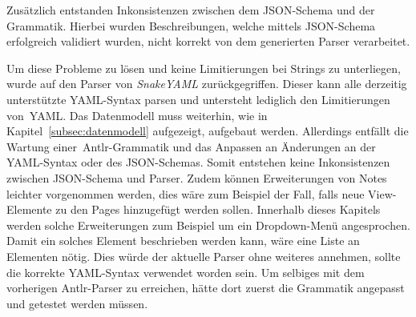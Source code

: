 Zusätzlich entstanden Inkonsistenzen zwischen dem JSON-Schema und der Grammatik.
Hierbei wurden Beschreibungen, welche mittels JSON-Schema erfolgreich validiert wurden, nicht korrekt von dem generierten Parser verarbeitet.

Um diese Probleme zu lösen und keine Limitierungen bei Strings zu unterliegen, wurde auf den Parser von \textit{SnakeYAML} zurückgegriffen.
Dieser kann alle derzeitig unterstützte YAML-Syntax parsen und untersteht lediglich den Limitierungen von~\ac{YAML}.
Das Datenmodell muss weiterhin, wie in Kapitel~\ref{subsec:datenmodell} aufgezeigt, aufgebaut werden.
Allerdings entfällt die Wartung einer~\ac{Antlr}-Grammatik und das Anpassen an Änderungen an der \ac{YAML}-Syntax oder des JSON-Schemas.
Somit entstehen keine Inkonsistenzen zwischen JSON-Schema und Parser.
Zudem können Erweiterungen von Notes leichter vorgenommen werden, dies wäre zum Beispiel der Fall, falls neue View-Elemente zu den Pages hinzugefügt
werden sollen.
Innerhalb dieses Kapitels werden solche Erweiterungen zum Beispiel um ein Dropdown-Menü angesprochen.
Damit ein solches Element beschrieben werden kann, wäre eine Liste an Elementen nötig.
Dies würde der aktuelle Parser ohne weiteres annehmen, sollte die korrekte \ac{YAML}-Syntax verwendet worden sein.
Um selbiges mit dem vorherigen \ac{Antlr}-Parser zu erreichen, hätte dort zuerst die Grammatik angepasst und getestet werden müssen.

